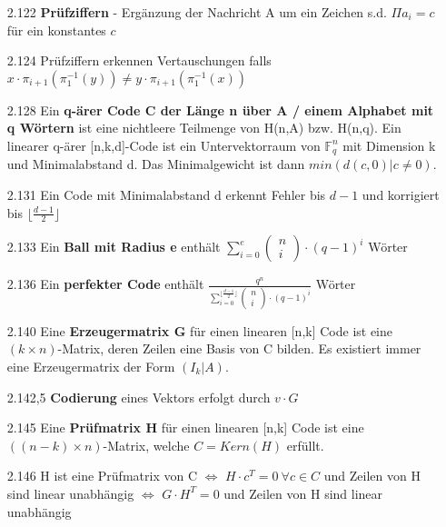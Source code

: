 \documentclass{scrartcl}
\begin{document}
\begin{itemize}
    \item [2.122] \textbf{Prüfziffern} - Ergänzung der Nachricht A um ein Zeichen s.d. $\Pi a_i = c$ für ein konstantes $c$

    \item [2.124] Prüfziffern erkennen Vertauschungen falls $x \cdot \pi_{i+1}(\pi_1^{-1}(y)) \neq y \cdot \pi_{i+1}(\pi_1^{-1}(x))$

    \item [2.128] Ein \textbf{q-ärer Code C der Länge n über A / einem Alphabet mit q Wörtern} ist eine nichtleere Teilmenge von H(n,A) bzw. H(n,q). Ein linearer q-ärer [n,k,d]-Code ist ein Untervektorraum von $\mathbb{F}_q^n$ mit Dimension k und Minimalabstand d. Das Minimalgewicht ist dann $min(d(c,0)|c \neq 0)$.

    \item [2.131] Ein Code mit Minimalabstand d erkennt Fehler bis $d-1$ und korrigiert bis $\lfloor \frac{d-1}{2} \rfloor$

    \item [2.133] Ein \textbf{Ball mit Radius e} enthält $\sum^{e}_{i=0} \begin{pmatrix}n \\ i\end{pmatrix}\cdot(q-1)^i$ Wörter

    \item [2.136] Ein \textbf{perfekter Code} enthält $\frac{q^n}{\sum^{\lfloor \frac{d-1}{2} \rfloor}_{i=0}\begin{pmatrix}n \\ i\end{pmatrix} \cdot (q-1)^i}$ Wörter

    \item [2.140] Eine \textbf{Erzeugermatrix G} für einen linearen [n,k] Code ist eine $(k \times n)$-Matrix, deren Zeilen eine Basis von C bilden. Es existiert immer eine Erzeugermatrix der Form $(I_k | A)$.

    \item [2.142,5] \textbf{Codierung} eines Vektors erfolgt durch $v \cdot G$

    \item [2.145] Eine \textbf{Prüfmatrix H} für einen linearen [n,k] Code ist eine $((n-k) \times n)$-Matrix, welche $C = Kern(H)$ erfüllt.

    \item [2.146] H ist eine Prüfmatrix von C $\Leftrightarrow$ $H \cdot c^T = 0 \ \forall c \in C$ und Zeilen von H sind linear unabhängig $\Leftrightarrow$ $G \cdot H^T = 0$ und Zeilen von H sind linear unabhängig


\end{itemize}
\end{document}
